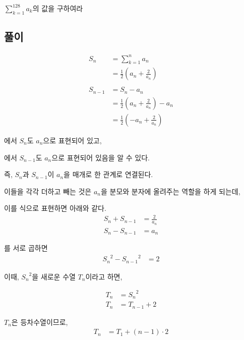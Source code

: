 \documentclass[a4paper,12pt]{article}
\begin{document}
    $\sum _ {k=1} ^{128} a_k$의 값을 구하여라

\subsection{풀이}

\begin{align}
    S_n &= \sum_{k=1}^n a_n \nonumber \\
        &= \frac{1}{2}\left(a_n + \frac{2}{a_n}\right)  \label{eq:S_n}\\[6pt]
    \nonumber \\
    S_{n-1} &= S_n - a_n \nonumber \\
            &= \frac{1}{2}\left(a_n + \frac{2}{a_n}\right) - a_n \nonumber \\
            &= \frac{1}{2}\left(-a_n + \frac{2}{a_n}\right) \label{eq:S_n-1}
\end{align}


에서 $S_n$도 $a_n$으로 표현되어 있고,

에서 $S_{n-1}$도 $a_n$으로 표현되어 있음을 알 수 있다.

즉, $S_n$과 $S_{n-1}$이 $a_n$을 매개로 한 관계로 연결된다.

이들을 각각 더하고 빼는 것은 $a_n$을 분모와 분자에 올려주는 역할을 하게 되는데,

이를 식으로 표현하면 아래와 같다.
\begin{align}
    S_n + S_{n-1} &= \frac{2}{a_n} \label{eq:sum}\\
    S_n - S_{n-1} &= a_n \label{eq:diff}
\end{align}

를 서로 곱하면
\begin{align}
    {S_n}^2 - {S_{n-1}}^2 &= 2 \label{eq:diff_square}
\end{align}

\newpage
이때, ${S_n}^2$을 새로운 수열 ${T_n}$이라고 하면,

\begin{align}
    T_n &= {S_n}^2 \nonumber \\
    T_n &= T_{n-1} + 2 \label{eq:Tn}
\end{align}

$T_n$은 등차수열이므로,
\begin{align}
    T_n &= T_1 + (n-1) \cdot 2 \label{eq:Tn2}
\end{align}
\end{document}
